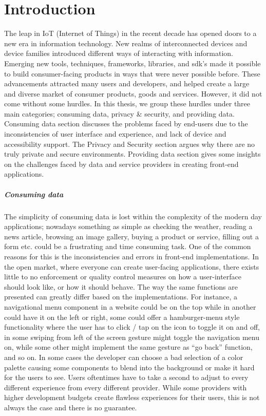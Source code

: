 
\chapter{Introduction}

The leap in IoT (Internet of Things) in the recent decade has opened doors to a new era in information technology. New realms of interconnected devices and device families introduced different ways of interacting with information. Emerging new tools, techniques, frameworks, libraries, and sdk's made it possible to build consumer-facing products in ways that were never possible before. These advancements attracted many users and developers, and helped create a large and diverse market of consumer products, goods and services. However, it did not come without some hurdles. In this thesis, we group these hurdles under three main categories; consuming data, privacy \& security, and providing data. Consuming data section discusses the problems faced by end-users due to the inconsistencies of user interface and experience, and lack of device and accessibility support. The Privacy and Security section argues why there are no truly private and secure environments. Providing data section gives some insights on the challenges faced by data and service providers in creating front-end applications.

\paragraph{Consuming data}

The simplicity of consuming data is lost within the complexity of the modern day applications; nowadays something as simple as checking the weather, reading a news article, browsing an image gallery, buying a product or service, filling out a form etc. could be a frustrating and time consuming task. One of the common reasons for this is the inconsistencies and errors in front-end implementations. In the open market, where everyone can create user-facing applications, there exists little to no enforcement or quality control measures on how a user-interface should look like, or how it should behave. The way the same functions are presented can greatly differ based on the implementations. For instance, a navigational menu component in a website could be on the top while in another could have it on the left or right, some could offer a hamburger-menu style functionality where the user has to click / tap on the icon to toggle it on and off, in some swiping from left of the screen gesture might toggle the navigation menu on, while some other might implement the same gesture as “go back” function, and so on. In some cases the developer can choose a bad selection of a color palette causing some components to blend into the background or make it hard for the users to see. Users oftentimes have to take a second to adjust to every different experience from every different provider. While some providers with higher development budgets create flawless experiences for their users, this is not always the case and there is no guarantee.

